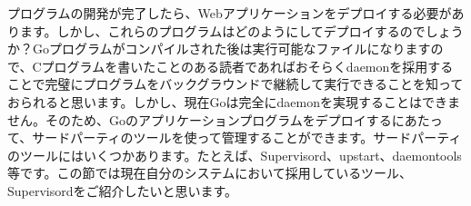 プログラムの開発が完了したら、Webアプリケーションをデプロイする必要があります。しかし、これらのプログラムはどのようにしてデプロイするのでしょうか？Goプログラムがコンパイルされた後は実行可能なファイルになりますので、Cプログラムを書いたことのある読者であればおそらくdaemonを採用することで完璧にプログラムをバックグラウンドで継続して実行できることを知っておられると思います。しかし、現在Goは完全にdaemonを実現することはできません。そのため、Goのアプリケーションプログラムをデプロイするにあたって、サードパーティのツールを使って管理することができます。サードパーティのツールにはいくつかあります。たとえば、Supervisord、upstart、daemontools等です。この節では現在自分のシステムにおいて採用しているツール、Supervisordをご紹介したいと思います。
